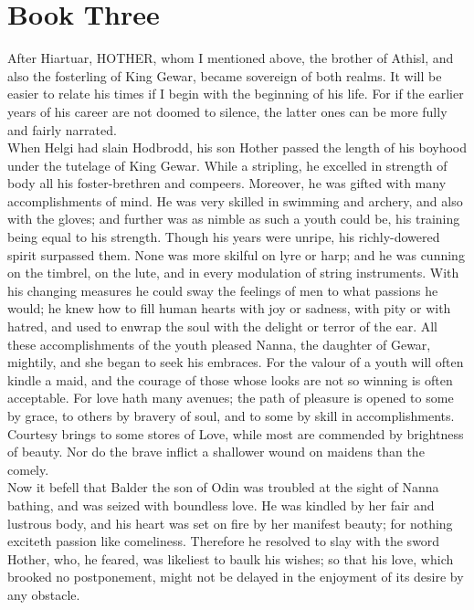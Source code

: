 \documentclass[10pt,a4paper]{report}
\begin{document}
\chapter{Book Three}

After Hiartuar, HOTHER, whom I mentioned above, the brother of Athisl, and also the fosterling of King Gewar, became sovereign of both realms. It will be easier to relate his times if I begin with the beginning of his life. For if the earlier years of his career are not doomed to silence, the latter ones can be more fully and fairly narrated.\\

When Helgi had slain Hodbrodd, his son Hother passed the length of his boyhood under the tutelage of King Gewar. While a stripling, he excelled in strength of body all his foster-brethren and compeers. Moreover, he was gifted with many accomplishments of mind. He was very skilled in swimming and archery, and also with the gloves; and further was as nimble as such a youth could be, his training being equal to his strength. Though his years were unripe, his richly-dowered spirit surpassed them. None was more skilful on lyre or harp; and he was cunning on the timbrel, on the lute, and in every modulation of string instruments. With his changing measures he could sway the feelings of men to what passions he would; he knew how to fill human hearts with joy or sadness, with pity or with hatred, and used to enwrap the soul with the delight or terror of the ear. All these accomplishments of the youth pleased Nanna, the daughter of Gewar, mightily, and she began to seek his embraces. For the valour of a youth will often kindle a maid, and the courage of those whose looks are not so winning is often acceptable. For love hath many avenues; the path of pleasure is opened to some by grace, to others by bravery of soul, and to some by skill in accomplishments. Courtesy brings to some stores of Love, while most are commended by brightness of beauty. Nor do the brave inflict a shallower wound on maidens than the comely.\\

Now it befell that Balder the son of Odin was troubled at the sight of Nanna bathing, and was seized with boundless love. He was kindled by her fair and lustrous body, and his heart was set on fire by her manifest beauty; for nothing exciteth passion like comeliness. Therefore he resolved to slay with the sword Hother, who, he feared, was likeliest to baulk his wishes; so that his love, which brooked no postponement, might not be delayed in the enjoyment of its desire by any obstacle.\\
\end{document}
